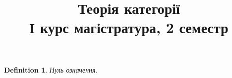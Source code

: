 \documentclass[a4paper, 10pt]{article}
\title{Теорія категорії \\ І курс магістратура, 2 семестр}
\theoremstyle{theoremdd}
\newtheorem{definition}[theorem]{Definition}
\begin{document}
\maketitle
\newpage
\tableofcontents
\newpage
\begin{definition}
Нуль означення.
\end{definition}
\end{document}
